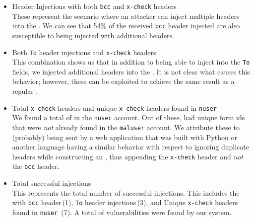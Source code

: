

\begin{itemize}
	\item \Email Header Injections with both \texttt{bcc} and \texttt{x-check} headers\\
	  These represent the scenario where an attacker can inject multiple headers into the \emails. We can see that 54\% of the received \texttt{bcc} header injected \emails are also susceptible to being injected with additional headers.
	
	\item Both \texttt{To} header injections and \texttt{x-check} headers \\
	This combination shows us that in addition to being able to inject into the \texttt{To} fields, we injected additional headers into the \email. It is not clear what causes this behavior; however, these can be exploited to achieve the same result as a regular \ehi.
	
	\item Total \texttt{x-check} headers and unique \texttt{x-check} headers found in \texttt{nuser} \emails\\
		We found a total of \ehinuserxcheck \emails in the \texttt{nuser} account. Out of these, \ehiuniquenuserxcheck had unique form ids that were \emph{not} already found in the \texttt{maluser} account. We attribute these \emails to (probably) being sent by a web application that was built with Python or another language having a similar behavior with respect to ignoring duplicate headers while constructing an \email, thus appending the \texttt{x-check} header and \emph{not} the \texttt{bcc} header. 
	
	\item Total successful injections\\
	  This represents the total number of successful injections. This includes the \ehi with \texttt{bcc} header\,(1), \texttt{To} header injections\,(3), and Unique \texttt{x-check} headers found in \texttt{nuser} \emails\,(7). A total of \success vulnerabilities were found by our system.

	
\end{itemize}
